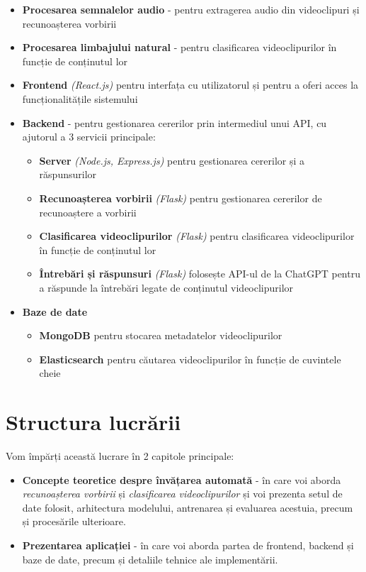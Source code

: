 \begin{itemize}
    \item \textbf{Procesarea semnalelor audio} - pentru extragerea audio din videoclipuri și recunoașterea vorbirii
    \item \textbf{Procesarea limbajului natural} - pentru clasificarea videoclipurilor în funcție de conținutul lor
    \item \textbf{Frontend} \textit{(React.js)} pentru interfața cu utilizatorul și pentru a oferi acces la funcționalitățile sistemului
    \item \textbf{Backend} - pentru gestionarea cererilor prin intermediul unui API, cu ajutorul a 3 servicii principale:
    \begin{itemize}
        \item \textbf{Server} \textit{(Node.js, Express.js)} pentru gestionarea cererilor și a răspunsurilor
        \item \textbf{Recunoașterea vorbirii} \textit{(Flask)} pentru gestionarea cererilor de recunoaștere a vorbirii
        \item \textbf{Clasificarea videoclipurilor} \textit{(Flask)} pentru clasificarea videoclipurilor în funcție de conținutul lor
        \item \textbf{Întrebări și răspunsuri} \textit{(Flask)} folosește API-ul de la ChatGPT pentru a răspunde la întrebări
        legate de conținutul videoclipurilor
    \end{itemize}
    \item \textbf{Baze de date} 
    \begin{itemize}
        \item \textbf{MongoDB} pentru stocarea metadatelor videoclipurilor
        \item \textbf{Elasticsearch} pentru căutarea videoclipurilor în funcție de cuvintele cheie
    \end{itemize}
\end{itemize}


\section{Structura lucrării}

Vom împărți această lucrare în 2 capitole principale:

\begin{itemize}
    \item \textbf{Concepte teoretice despre învățarea automată} - în care voi aborda \textit{recunoașterea vorbirii} și 
    \textit{clasificarea videoclipurilor} și voi prezenta setul de date folosit, arhitectura modelului,
    antrenarea și evaluarea acestuia, precum și procesările ulterioare.
    \item \textbf{Prezentarea aplicației} - în care voi aborda partea de frontend, backend și baze de date,
    precum și detaliile tehnice ale implementării.
\end{itemize}